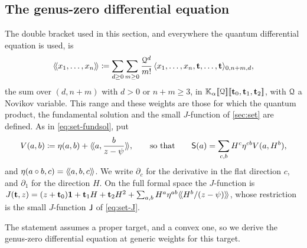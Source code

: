 \subsection{The genus-zero differential equation}

The double bracket used in this section, and everywhere the quantum differential equation is used, is
\[
\langle\!\langle x_1,\dots,x_n \rangle\!\rangle\coloneqq\sum_{d\geq0}\sum_{m\geq0}\frac{\mathcal{Q}^d}{m!}\,\langle x_1,\dots,x_n,\mathbf{t},\dots,\mathbf{t}\rangle_{0,n+m,d},
\]
the sum over $(d,n+m)$ with $d>0$ or $n+m\geq3$, in $\mathbb{K}_{\alpha}[\![ \mathcal{Q} ]\!][\![ \mathbf{t}_0,\mathbf{t}_1,\mathbf{t}_2 ]\!]$, with $\mathcal{Q}$ a Novikov variable. This range and these weights are those for which the quantum product, the fundamental solution and the small $J$-function of \cref{sec:set} are defined.  As in \cref{eq:set-fundsol}, put
\[
V(a,b)\coloneqq\eta(a,b)+\langle\!\langle a,\frac{b}{z-\psi} \rangle\!\rangle,\qquad\text{so that}\qquad\mathsf{S}(a)=\sum_{c,b}H^c\eta^{cb}V(a,H^b),
\]
and $\eta(a\circ b,c)=\langle\!\langle a,b,c \rangle\!\rangle$. We write $\partial_c$ for the derivative in the flat direction $c$, and $\partial_1$ for the direction $H$. On the full formal space the $J$-function is $J(\mathbf{t},z)=(z+\mathbf{t}_0)\mathbf{1}+\mathbf{t}_1H+\mathbf{t}_2H^2+\sum_{a,b}H^a\eta^{ab}\langle\!\langle H^b/(z-\psi) \rangle\!\rangle$, whose restriction is the small $J$-function $\mathsf{J}$ of \cref{eq:set-J}. 

The statement \cite[Prop.~2.4]{Iri} assumes a proper target, and \cite[Section~1]{Pan98} a convex one, so we derive the genus-zero differential equation at generic weights for this target.

